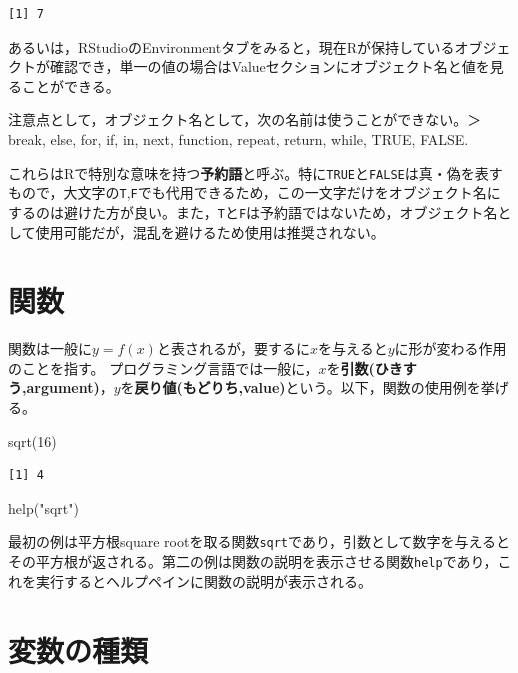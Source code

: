 \documentclass[
  a4paper,
]{ltjsbook}
\newenvironment{Shaded}{\begin{snugshade}}{\end{snugshade}}
\newcommand{\DecValTok}[1]{\textcolor[rgb]{0.68,0.00,0.00}{#1}}
\newcommand{\FunctionTok}[1]{\textcolor[rgb]{0.28,0.35,0.67}{#1}}
\newcommand{\NormalTok}[1]{\textcolor[rgb]{0.00,0.23,0.31}{#1}}
\newcommand{\StringTok}[1]{\textcolor[rgb]{0.13,0.47,0.30}{#1}}
\begin{document}
\begin{verbatim}
[1] 7
\end{verbatim}

あるいは，RStudioのEnvironmentタブをみると，現在Rが保持しているオブジェクトが確認でき，単一の値の場合はValueセクションにオブジェクト名と値を見ることができる。

注意点として，オブジェクト名として，次の名前は使うことができない。＞
break, else, for, if, in, next, function, repeat, return, while, TRUE,
FALSE.

これらはRで特別な意味を持つ\textbf{予約語}と呼ぶ。特に\texttt{TRUE}と\texttt{FALSE}は真・偽を表すもので，大文字の\texttt{T},\texttt{F}でも代用できるため，この一文字だけをオブジェクト名にするのは避けた方が良い。また，\texttt{T}と\texttt{F}は予約語ではないため，オブジェクト名として使用可能だが，混乱を避けるため使用は推奨されない。

\section{関数}\label{ux95a2ux6570}

関数は一般に\(y=f(x)\)と表されるが，要するに\(x\)を与えると\(y\)に形が変わる作用のことを指す。
プログラミング言語では一般に，\(x\)を\textbf{引数(ひきすう,argument)}，\(y\)を\textbf{戻り値(もどりち,value)}という。以下，関数の使用例を挙げる。

\begin{Shaded}
\begin{Highlighting}[]
\FunctionTok{sqrt}\NormalTok{(}\DecValTok{16}\NormalTok{)}
\end{Highlighting}
\end{Shaded}

\begin{verbatim}
[1] 4
\end{verbatim}

\begin{Shaded}
\begin{Highlighting}[]
\FunctionTok{help}\NormalTok{(}\StringTok{"sqrt"}\NormalTok{)}
\end{Highlighting}
\end{Shaded}

最初の例は平方根square
rootを取る関数\texttt{sqrt}であり，引数として数字を与えるとその平方根が返される。第二の例は関数の説明を表示させる関数\texttt{help}であり，これを実行するとヘルプペインに関数の説明が表示される。

\section{変数の種類}\label{ux5909ux6570ux306eux7a2eux985e}
\end{document}
